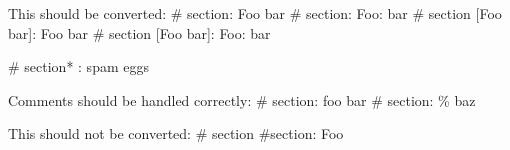 This should be converted:
# section: Foo bar
# section: Foo: bar
# section [Foo bar]: Foo bar
# section [Foo\: bar]: Foo: bar

# section* : spam eggs

Comments should be handled correctly:
# section: foo bar %
# section: \% baz %

This should not be converted:
# section
#section: Foo
